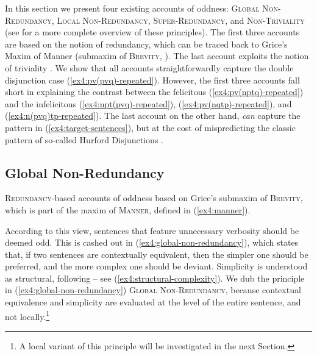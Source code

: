 In this section we present four existing accounts of oddness: \textsc{Global Non-Redundancy}, \textsc{Local Non-Redundancy}, \textsc{Super-Redundancy}, and \textsc{Non-Triviality} (see  for a more complete overview of these principles). The first three accounts are based on the notion of redundancy, which can be traced back to Grice's Maxim of Manner (submaxim of \textsc{Brevity}, ). The last account exploits the notion of triviality \citep{Stalnaker1974}. We show that all accounts straightforwardly capture the double disjunction case (\ref{ex4:pv(pvq)-repeated}). However, the first three accounts fall short in explaining the contrast between the felicitous (\ref{ex4:pv(nptq)-repeated}) and the infelicitous (\ref{ex4:npt(pvq)-repeated}), (\ref{ex4:pv(nqtp)-repeated}), and (\ref{ex4:n(pvq)tp-repeated}). The last account on the other hand, \textit{can} capture the pattern in (\ref{ex4:target-sentences}), but at the cost of mispredicting the classic pattern of so-called Hurford Disjunctions \citep{Hurford1974}.

\subsection{Global Non-Redundancy}

\textsc{Redundancy}-based accounts of oddness based on Grice's submaxim of \textsc{Brevity}, which is part of the maxim of \textsc{Manner}, defined in (\ref{ex4:manner}).

\begin{exe}
	\label{ex4:manner}
\end{exe}

According to this view, sentences that feature unnecessary verbosity should be deemed odd. This is cashed out in (\ref{ex4:global-non-redundancy}), which states that, if two sentences are contextually equivalent, then the simpler one should be preferred, and the more complex one should be deviant. Simplicity is understood as structural, following \citet{Katzir2007} -- see (\ref{ex4:structural-complexity}). We dub the principle in (\ref{ex4:global-non-redundancy}) \textsc{Global Non-Redundancy}, because contextual equivalence and simplicity are evaluated at the level of the entire sentence, and not locally.\footnote{A local variant of this principle will be investigated in the next Section.}

